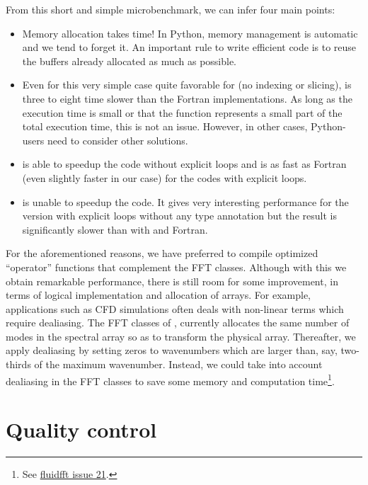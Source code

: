 \documentclass{../jors}
\begin{document}
From this short and simple microbenchmark, we can infer four main points:
\begin{itemize}
\item Memory allocation takes time!  In Python, memory management is automatic
and we tend to forget it.  An important rule to write efficient code is to
reuse the buffers already allocated as much as possible.

\item Even for this very simple case quite favorable for  (no indexing
or slicing),  is three to eight time slower than the Fortran
implementations. As long as the execution time is small or that the
function represents a small part of the total execution time, this is not an
issue. However, in other cases, Python- users need to consider
other solutions.

\item {} is able to speedup the  code without explicit
loops and is as fast as Fortran (even slightly faster in our case) for the
codes with explicit loops.

\item {} is unable to speedup the  code.
%
It gives very interesting performance for the version with explicit loops
without any type annotation but the result is significantly slower than with
 and Fortran.
\end{itemize}

For the aforementioned reasons, we have preferred  to compile
optimized ``operator'' functions that complement the FFT classes. Although with
this we obtain remarkable performance, there is still room for some
improvement, in terms of logical implementation and allocation of arrays. For
example, applications such as CFD simulations often deals with non-linear terms
which require dealiasing. The FFT classes of , currently
allocates the same number of modes in the spectral array so as to transform the
physical array. Thereafter, we apply dealiasing by setting zeros to wavenumbers
which are larger than, say, two-thirds of the maximum wavenumber. Instead, we
could take into account dealiasing in the FFT classes to save some memory and
computation time\footnote{See
\href{https://bitbucket.org/fluiddyn/fluidfft/issues/21/}{fluidfft issue 21}.}.

\section*{Quality control}
\end{document}

